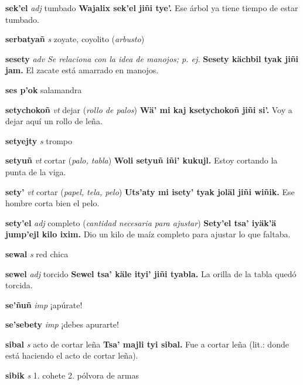 \documentclass[10pt]{scrbook}
\newcommand{\entry}[1]{\textbf{#1}}
\newcommand{\onedefinition}[1]{#1.}
\newcommand{\nontranslationdef}[1]{\textit{#1}}
\newcommand{\partofspeech}[1]{\textit{#1}}
\newcommand{\spanishtranslation}[1]{#1}
\newcommand{\clarification}[1]{(\textit{#1})}
\newcommand{\cholexample}[1]{\textbf{#1}}
\newcommand{\exampletranslation}[1]{#1}
\begin{document}
\begin{multicols}{2}
\entry{sek'el}
\partofspeech{adj}
\spanishtranslation{tumbado}
\cholexample{Wajalix sek'el jiñi tye'.}
\exampletranslation{Ese árbol ya tiene tiempo de estar tumbado.}

\entry{serbatyañ}
\partofspeech{s}
\spanishtranslation{zoyate, coyolito}
\clarification{arbusto}

\entry{sesety}
\partofspeech{adv}
\nontranslationdef{Se relaciona con la idea de manojos; p. ej.}
\cholexample{Sesety kächbil tyak jiñi jam.}
\exampletranslation{El zacate está amarrado en manojos.}

\entry{ses p'ok}
\spanishtranslation{salamandra}

\entry{setychokoñ}
\partofspeech{vt}
\spanishtranslation{dejar}
\clarification{rollo de palos}
\cholexample{Wä' mi kaj ksetychokoñ jiñi si'.}
\exampletranslation{Voy a dejar aquí un rollo de leña.}

\entry{setyejty}
\partofspeech{s}
\spanishtranslation{trompo}

\entry{setyuñ}
\partofspeech{vt}
\spanishtranslation{cortar}
\clarification{palo, tabla}
\cholexample{Woli setyuñ iñi' kukujl.}
\exampletranslation{Estoy cortando la punta de la viga.}

\entry{sety'}
\partofspeech{vt}
\spanishtranslation{cortar}
\clarification{papel, tela, pelo}
\cholexample{Uts'aty mi isety' tyak joläl jiñi wiñik.}
\exampletranslation{Ese hombre corta bien el pelo.}

\entry{sety'el}
\partofspeech{adj}
\spanishtranslation{completo}
\clarification{cantidad necesaria para ajustar}
\cholexample{Sety'el tsa' iyäk'ä jump'ejl kilo ixim.}
\exampletranslation{Dio un kilo de maíz completo para ajustar lo que faltaba.}

\entry{sewal}
\partofspeech{s}
\spanishtranslation{red chica}

\entry{sewel}
\partofspeech{adj}
\spanishtranslation{torcido}
\cholexample{Sewel tsa' käle ityi' jiñi tyabla.}
\exampletranslation{La orilla de la tabla quedó torcida.}

\entry{se'ñuñ}
\partofspeech{imp}
\spanishtranslation{¡apúrate!}

\entry{se'sebety}
\partofspeech{imp}
\spanishtranslation{¡debes apurarte!}

\entry{sibal}
\partofspeech{s}
\spanishtranslation{acto de cortar leña}
\cholexample{Tsa' majli tyi sibal.}
\exampletranslation{Fue a cortar leña (lit.: donde está haciendo el acto de cortar leña).}

\entry{sibik}
\partofspeech{s}
\onedefinition{1}
\spanishtranslation{cohete}
\onedefinition{2}
\spanishtranslation{pólvora de armas}


\end{multicols}
\end{document}
